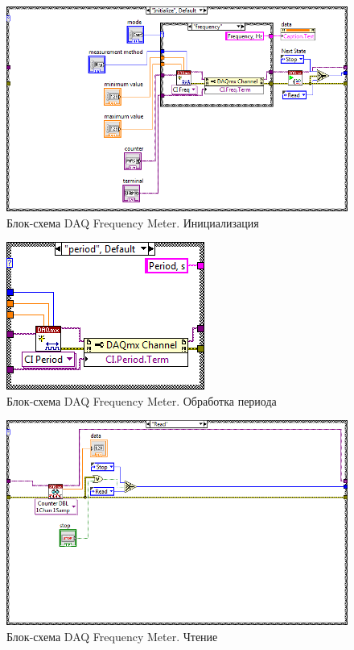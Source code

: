 \documentclass[a4paper,14pt]{article}
\begin{document}
\begin{figure}[H]
	\centering
	\includegraphics[width=\linewidth]{image/dfm_schema_init}
	\caption{Блок-схема DAQ Frequency Meter. Инициализация}\label{img:dfm_schema_init}
\end{figure}

\begin{figure}[H]
	\centering
	\includegraphics[width=0.7\linewidth]{image/dfm_schema_period}
	\caption{Блок-схема DAQ Frequency Meter. Обработка периода}\label{img:dfm_schema_period}
\end{figure}

\begin{figure}[H]
	\centering
	\includegraphics[width=\linewidth]{image/dfm_schema_read}
	\caption{Блок-схема DAQ Frequency Meter. Чтение}\label{img:dfm_schema_read}
\end{figure}
\end{document}
